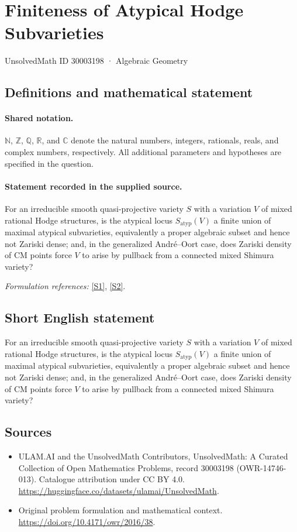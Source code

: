\documentclass[11pt]{article}
\newcommand{\sref}[2]{\hyperlink{source:#1:#2}{[S#2]}}
\begin{document}
\setcounter{section}{30003197}
\section{Finiteness of Atypical Hodge Subvarieties}\label{30003198}
{\small UnsolvedMath ID 30003198 · Algebraic Geometry}
\subsection{Definitions and mathematical statement}

\paragraph{Shared notation.}$\mathbb N$, $\mathbb Z$, $\mathbb Q$, $\mathbb R$, and $\mathbb C$ denote the natural numbers, integers, rationals, reals, and complex numbers, respectively. All additional parameters and hypotheses are specified in the question.


\paragraph{Statement recorded in the supplied source.}
For an irreducible smooth quasi-projective variety $S$ with a variation $V$ of mixed rational Hodge structures, is the atypical locus $S_{\mathrm{atyp}}(V)$ a finite union of maximal atypical subvarieties, equivalently a proper algebraic subset and hence not Zariski dense; and, in the generalized André–Oort case, does Zariski density of CM points force $V$ to arise by pullback from a connected mixed Shimura variety?
\par\smallskip\textit{Formulation references:} \sref{30003198}{1}, \sref{30003198}{2}.
\subsection{Short English statement}
For an irreducible smooth quasi-projective variety $S$ with a variation $V$ of mixed rational Hodge structures, is the atypical locus $S_{\mathrm{atyp}}(V)$ a finite union of maximal atypical subvarieties, equivalently a proper algebraic subset and hence not Zariski dense; and, in the generalized André–Oort case, does Zariski density of CM points force $V$ to arise by pullback from a connected mixed Shimura variety?
\subsection{Sources}
\begin{itemize}
\item[\hypertarget{source:30003198:1}{S1}] ULAM.AI and the UnsolvedMath Contributors, UnsolvedMath: A Curated Collection of Open Mathematics Problems, record 30003198 (OWR-14746-013). Catalogue attribution under CC BY 4.0.
\url{https://huggingface.co/datasets/ulamai/UnsolvedMath}.
\item[\hypertarget{source:30003198:2}{S2}] Original problem formulation and mathematical context.
\url{https://doi.org/10.4171/owr/2016/38}.
\end{itemize}
\label{end:30003198}
\end{document}
